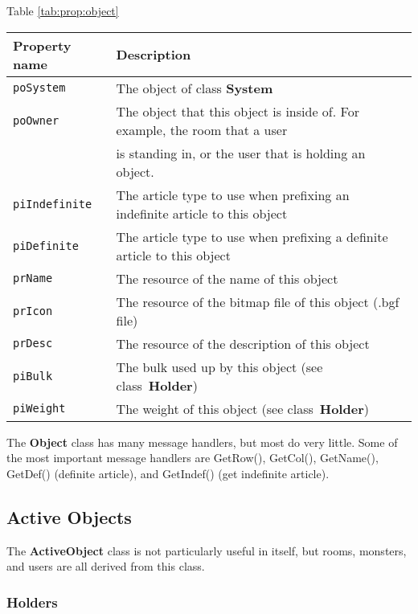 \documentclass[12pt]{article}
\newcommand{\class}[1]{\textbf{#1}}
\newcommand{\prop}[1]{\texttt{#1}}
\begin{document}
\begin{center}
\begin{center}Table \ref{tab:prop:object} \end{center}
\begin{tabular}{||l|l||} \hline
Property name & Description 
\\ \hline \hline
\prop{poSystem} &  The object of class \class{System}
\\ \hline
\prop{poOwner}  &  The object that this object is inside of.  For example, the room that a user \\
         &  is standing in, or the user that is holding an object.
\\ \hline
\prop{piIndefinite} &  The article type to use when prefixing an indefinite
article to this object 
\\ \hline
\prop{piDefinite} &  The article type to use when prefixing a definite
article to this object
\\ \hline
\prop{prName} 	 &  The resource of the name of this object
\\ \hline
\prop{prIcon}   &  The resource of the bitmap file of this object (.bgf file)
\\ \hline
\prop{prDesc}   &  The resource of the description of this object
\\ \hline
\prop{piBulk}   &  The bulk used up by this object (see class~\class{Holder})
\\ \hline
\prop{piWeight} &  The weight of this object (see class~\class{Holder})
\\ \hline
\end{tabular}
\label{tab:prop:object}
\end{center}

The \class{Object} class has many message handlers, but most do very
little.  Some of the most important message handlers are GetRow(),
GetCol(), GetName(), GetDef() (definite article), and GetIndef() (get
indefinite article).

\subsection{Active Objects}

The \class{ActiveObject} class is not particularly useful in itself, but
rooms, monsters, and users are all derived from this class.

\subsubsection{Holders}
\end{document}
